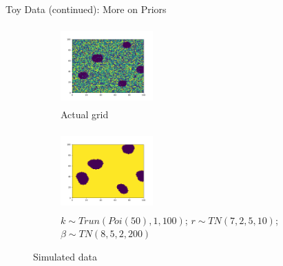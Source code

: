 \documentclass[10pt,mathserif]{beamer}
\begin{document}
\begin{frame}{Toy Data (continued): More on Priors}
\begin{figure}[t!]
    \centering
    \begin{subfigure}[t]{0.3\textwidth}
        \centering
        \includegraphics[height=1.2in, width=1.4in]{../BDC_gridactual}
        \caption{Actual grid}
    \end{subfigure}%
    \begin{subfigure}[t]{0.3\textwidth}
        \centering
        \includegraphics[height=1.2in, width=1.4in]{../BDC_grid1}
        \caption{$k \sim Trun(Poi(50), 1, 100)$; $r \sim TN(7, 2, 5, 10)$; $\beta \sim TN(8, 5, 2, 200)$}
    \end{subfigure} %
    \caption{Simulated data}
\end{figure}
\end{frame}
\end{document}

